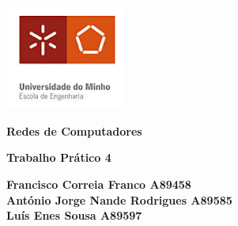 \documentclass[11pt]{article}
\begin{document}
\begin{titlepage}
    \begin{center}
        \includegraphics[width=0.3\textwidth]{images/capa/EscolaEngenhariaUM.jpeg}
    
        \vspace{1cm}
        
        \textbf{\LARGE Redes de Computadores}
    
        \vspace{0.5cm}
        \textbf{\Large Trabalho Prático 4}

        \vspace{1.3cm}
        
        \textbf{\large Francisco Correia Franco A89458 \\
        António Jorge Nande Rodrigues A89585 \\
        Luís Enes Sousa A89597}

        \vspace{1.5cm}
    

\end{center}
\end{titlepage}
\end{document}
